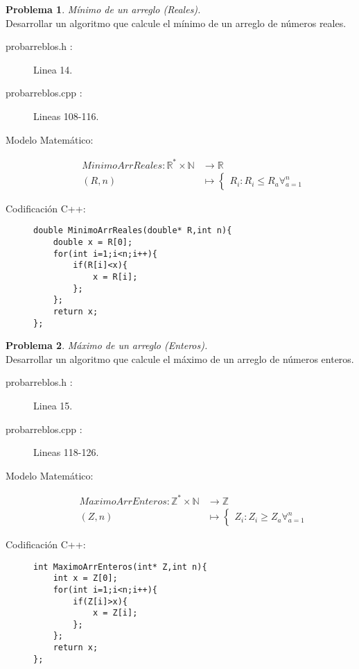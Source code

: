 \documentclass{article}
\theoremstyle{plain}
\theoremstyle{definition}
\newtheorem{problem}{Problema}
\begin{document}
\begin{problem} \emph{Mínimo de un arreglo (Reales).}\\
\hspace*{7mm}Desarrollar un algoritmo que calcule el mínimo de un arreglo de números reales.
\begin{description}
\item[probarreblos.h :] Linea 14. \item[probarreblos.cpp :] Lineas 108-116.

\item[Modelo Matemático:]
\begin{align*}
MinimoArrReales: \mathbb{R}^{*}\times\mathbb{N} &\to \mathbb{R}\\
(R,n) &\mapsto
\begin{cases}
R_i: R_i \leq R_a \forall_{a=1}^n 
\end{cases}
\end{align*}
%
\item[Codificación \textsf{C++}:]\hfill
%
\begin{verbatim}
double MinimoArrReales(double* R,int n){
    double x = R[0];
    for(int i=1;i<n;i++){
        if(R[i]<x){
            x = R[i];
        };
    };
    return x;
};
\end{verbatim}
\end{description}
\end{problem}

\begin{problem} \emph{Máximo de un arreglo (Enteros).}\\
\hspace*{7mm}Desarrollar un algoritmo que calcule el máximo de un arreglo de números enteros. 
\begin{description}
\item[probarreblos.h :] Linea 15. \item[probarreblos.cpp :] Lineas 118-126.

\item[Modelo Matemático:]
\begin{align*}
MaximoArrEnteros: \mathbb{Z}^{*}\times\mathbb{N} &\to \mathbb{Z}\\
(Z,n) &\mapsto
\begin{cases}
Z_i: Z_i \geq Z_a \forall_{a=1}^n
\end{cases}
\end{align*}
%
\item[Codificación \textsf{C++}:]\hfill
%
\begin{verbatim}
int MaximoArrEnteros(int* Z,int n){
    int x = Z[0];
    for(int i=1;i<n;i++){
        if(Z[i]>x){
            x = Z[i];
        };
    };
    return x;
};
\end{verbatim}
\end{description}
\end{problem}
\end{document}
